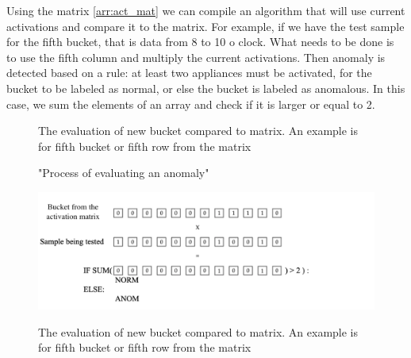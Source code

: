 Using the matrix \ref{arr:act_mat} we can compile an algorithm that will use current activations 
and compare it to the matrix. For example, if we have the test sample for the fifth bucket, that is 
data from 8 to 10 o clock. 
What needs to be done is to use the fifth column and multiply the current activations.
Then anomaly is detected based on a rule: at least two appliances must be activated, for the bucket to be labeled as normal,
or else the bucket is labeled as anomalous. In this case, we sum the elements of an array and check if it is larger or equal to 2. 

\begin{figure}[H]
    \centering
    \caption{The evaluation of new bucket compared to matrix. An example is for fifth bucket or fifth row from the matrix}
\end{figure}

\begin{figure}[H]
    \centering
    \caption{"Process of evaluating an anomaly"}
    \includegraphics[width=1\linewidth]{../Figures/EC/EC_anom_dect.png}
    \label{fig:anom_detct}
    \caption{The evaluation of new bucket compared to matrix. An example is for fifth bucket or fifth row from the matrix}
    
\end{figure}

